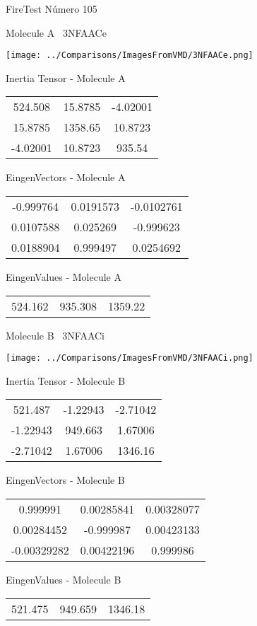 \vtab[-3cm]
\begin{center}
{\large FireTest \tab Número 105}
\end{center}
\begin{multicols}{2}
\begin{center}

Molecule A \
3NFAACe

\texttt{[image: ../Comparisons/ImagesFromVMD/3NFAACe.png]}

Inertia Tensor - Molecule A \\
\begin{tabular}{|c c c|}
524.508	 & 	15.8785	 & 	-4.02001	 \\
15.8785	 & 	1358.65	 & 	10.8723	 \\
-4.02001	 & 	10.8723	 & 	935.54
\end{tabular}

\vtab
 EingenVectors - Molecule A     \\
\begin{tabular}{|c c c|}
-0.999764	 & 	0.0191573	 & 	-0.0102761	 \\
0.0107588	 & 	0.025269	 & 	-0.999623	 \\
0.0188904	 & 	0.999497	 & 	0.0254692
\end{tabular}

\vtab
 EingenValues - Molecule A     \\
\begin{tabular}{|c c c|}
524.162	 & 	935.308	 & 	1359.22	 \\
\end{tabular}
\columnbreak

Molecule B \
3NFAACi

\texttt{[image: ../Comparisons/ImagesFromVMD/3NFAACi.png]}

Inertia Tensor - Molecule B \\
\begin{tabular}{|c c c|}
521.487	 & 	-1.22943	 & 	-2.71042	 \\
-1.22943	 & 	949.663	 & 	1.67006	 \\
-2.71042	 & 	1.67006	 & 	1346.16
\end{tabular}

\vtab
 EingenVectors - Molecule B     \\
\begin{tabular}{|c c c|}
0.999991	 & 	0.00285841	 & 	0.00328077	 \\
0.00284452	 & 	-0.999987	 & 	0.00423133	 \\
-0.00329282	 & 	0.00422196	 & 	0.999986
\end{tabular}

\vtab
 EingenValues - Molecule B     \\
\begin{tabular}{|c c c|}
521.475	 & 	949.659	 & 	1346.18	 \\
\end{tabular}

\end{center}
\end{multicols}

